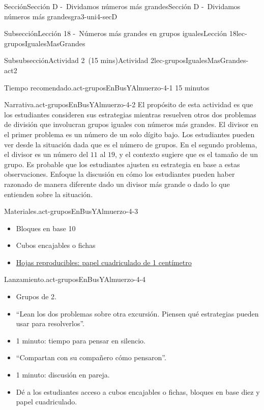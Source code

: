\documentclass[oneside,10pt,]{article}
\begin{document}
\begin{sectionptx}{Sección}{Sección D -~Dividamos números más grandes}{}{Sección D -~Dividamos números más grandes}{}{}{gra3-uni4-secD}
\begin{subsectionptx}{Subsección}{Lección 18 -~Números más grandes en grupos iguales}{}{Lección 18}{}{}{lec-gruposIgualesMasGrandes}
%
\begin{subsubsectionptx}{Subsubsección}{Actividad 2~(15 mins)}{}{Actividad 2}{}{}{lec-gruposIgualesMasGrandes-act2}
\par
\begin{paragraphs}{Tiempo recomendado.}{act-gruposEnBusYAlmuerzo-4-1}%
15 minutos%
\end{paragraphs}%
\begin{paragraphs}{Narrativa.}{act-gruposEnBusYAlmuerzo-4-2}%
El propósito de esta actividad es que los estudiantes consideren sus estrategias mientras resuelven otros dos problemas de división que involucran grupos iguales con números más grandes. El divisor en el primer problema es un número de un solo dígito bajo. Los estudiantes pueden ver desde la situación dada que es el número de grupos. En el segundo problema, el divisor es un número del \(11\) al \(19\), y el contexto sugiere que es el tamaño de un grupo. Es probable que los estudiantes ajusten su estrategia en base a estas observaciones. Enfoque la discusión en cómo los estudiantes pueden haber razonado de manera diferente dado un divisor más grande o dado lo que entienden sobre la situación.%
\end{paragraphs}%
\begin{paragraphs}{Materiales.}{act-gruposEnBusYAlmuerzo-4-3}%
%
\begin{itemize}[label=\textbullet]
\item{}Bloques en base 10%
\item{}Cubos encajables o fichas%
\item{}\hyperref[blm-papelCuadriculadoCentimetro]{Hojas reproducibles: papel cuadriculado de 1 centímetro}%
\end{itemize}
\end{paragraphs}%
\begin{paragraphs}{Lanzamiento.}{act-gruposEnBusYAlmuerzo-4-4}%
%
\begin{itemize}[label=\textbullet]
\item{}Grupos de 2.%
\item{}``Lean los dos problemas sobre otra excursión. Piensen qué estrategias pueden usar para resolverlos''.%
\item{}1 minuto: tiempo para pensar en silencio.%
\item{}``Compartan con su compañero cómo pensaron''.%
\item{}1 minuto: discusión en pareja.%
\item{}Dé a los estudiantes acceso a cubos encajables o fichas, bloques en base diez y papel cuadriculado.%

\end{itemize}
\end{paragraphs}
\end{subsubsectionptx}
\end{subsectionptx}
\end{sectionptx}
\end{document}
